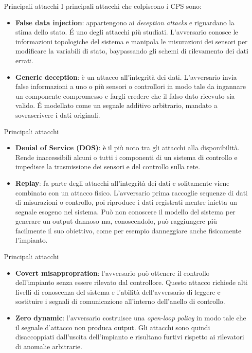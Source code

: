 \documentclass{beamer}
\begin{document}
\begin{frame}{Principali attacchi}
I principali attacchi che colpiscono i CPS sono:
\begin{itemize}
    \item \textbf{False data injection}: appartengono ai \textit{deception attacks} e riguardano la stima dello stato. \'E uno degli attacchi più studiati. 
    L'avversario conosce le informazioni topologiche del sistema e manipola le misurazioni dei sensori per modificare la variabili di stato, 
    baypassando gli schemi di rilevamento dei dati errati.
    \item \textbf{Generic deception}: è un attacco all'integrità dei dati. L'avversario invia false informazioni a uno o più sensori o controllori 
    in modo tale da ingannare un componente compromesso e fargli credere che il falso dato ricevuto sia valido.
    \'E modellato come un segnale additivo arbitrario, mandato a sovrascrivere i dati originali.
\end{itemize}
\end{frame}

\begin{frame}{Principali attacchi}
\begin{itemize}
    \item \textbf{Denial of Service (DOS)}: è il più noto tra gli attacchi alla disponibilità. Rende inaccessibili alcuni o tutti i componenti di un 
    sistema di controllo e impedisce la trasmissione dei sensori e del controllo sulla rete.
    \item \textbf{Replay}: fa parte degli attacchi all'integrità dei dati e solitamente viene combinato con un attacco fisico. L'avversario prima 
    raccoglie sequenze di dati di misurazioni o controllo, poi riproduce i dati registrati mentre inietta un segnale esogeno nel sistema. 
    Può non conoscere il modello del sistema per generare un output dannoso ma, conoscendolo, può raggiungere più facilmente il suo obiettivo, 
    come per esempio danneggiare anche fisicamente l'impianto.
\end{itemize}
\end{frame}

\begin{frame}{Principali attacchi}
\begin{itemize}
    \item \textbf{Covert misappropration}: l'avversario può ottenere il controllo dell'impianto senza essere rilevato dal controllore. 
    Questo attacco richiede alti livelli di conoscenza del sistema e l'abilità dell'avversario di leggere e sostituire i segnali di comunicazione  
    all'interno dell'anello di controllo.
    \item \textbf{Zero dynamic}: l'avversario costruisce una \textit{open-loop policy} in modo tale che il segnale d'attacco non produca output. 
    Gli attacchi sono quindi disaccoppiati dall'uscita dell'impianto e risultano furtivi rispetto ai rilevatori di anomalie arbitrarie. 
\end{itemize}
\end{frame}
\end{document}
